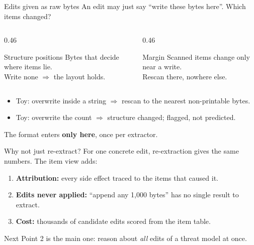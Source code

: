 \documentclass[aspectratio=169,11pt]{beamer}
\begin{document}
\begin{frame}{Edits given as raw bytes}
  An edit may just say ``write these bytes here''. Which items changed?
  \vfill
  \begin{columns}[T]
    \begin{column}{0.46\textwidth}
      \begin{block}{Structure positions}
        Bytes that decide where items lie.\\
        Write none $\Rightarrow$ the layout holds.
      \end{block}
    \end{column}
    \begin{column}{0.46\textwidth}
      \begin{block}{Margin}
        Scanned items change only near a write.\\
        Rescan there, nowhere else.
      \end{block}
    \end{column}
  \end{columns}
  \vfill
  \begin{itemize}
    \item Toy: overwrite inside a string $\Rightarrow$ rescan to the nearest non-printable bytes.
    \item Toy: overwrite the count $\Rightarrow$ structure changed; flagged, not predicted.
  \end{itemize}
  \vfill
  \begin{center}
    The format enters \textbf{only here}, once per extractor.
  \end{center}
\end{frame}

\begin{frame}{Why not just re-extract?}
  For one concrete edit, re-extraction gives the same numbers. The item view adds:
  \vfill
  \begin{enumerate}
    \item \textbf{Attribution:} every side effect traced to the items that caused it.
    \item \textbf{Edits never applied:} ``append any 1,000 bytes'' has no single result to extract.
    \item \textbf{Cost:} thousands of candidate edits scored from the item table.
  \end{enumerate}
  \vfill
  \begin{block}{Next}
    Point 2 is the main one: reason about \emph{all} edits of a threat model at once.
  \end{block}
\end{frame}
\end{document}
